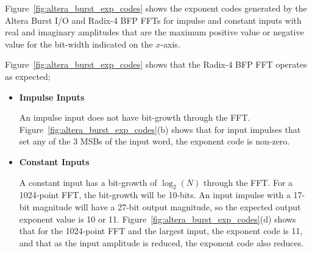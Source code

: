 Figure~\ref{fig:altera_burst_exp_codes} shows the exponent codes generated
by the Altera Burst I/O and Radix-4 BFP FFTs for impulse and constant
inputs with real and imaginary amplitudes that are the maximum positive
value or negative value for the bit-width indicated on the $x$-axis.

Figure~\ref{fig:altera_burst_exp_codes} shows that the
Radix-4 BFP FFT operates as expected;
%
\begin{itemize}
\item \textbf{Impulse Inputs}

An impulse input does not have bit-growth through the FFT.
Figure~\ref{fig:altera_burst_exp_codes}(b) shows that for input impulses
that set any of the 3 MSBs of the input word, the exponent code is non-zero.

\item \textbf{Constant Inputs}

A constant input has a bit-growth of $\log_2(N)$ through the FFT.
For a 1024-point FFT, the bit-growth will be 10-bits. An input impulse
with a 17-bit magnitude will have a 27-bit output magnitude, so the
expected output exponent value is 10 or 11.
Figure~\ref{fig:altera_burst_exp_codes}(d) shows that for the 1024-point
FFT and the largest input, the exponent code is 11, and that as the
input amplitude is reduced, the exponent code also reduces.
\end{itemize}

